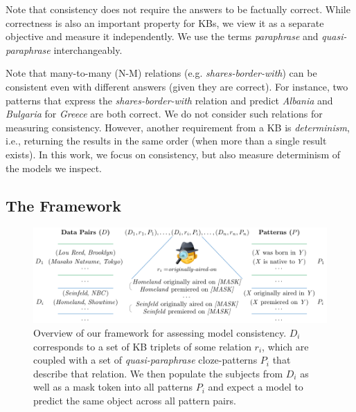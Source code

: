 Note that consistency does not require the answers to be factually correct. While correctness is also an important property for KBs, we view it as a separate objective and measure it independently.
We use the terms \textit{paraphrase} and \textit{quasi-paraphrase} interchangeably.
 


Note that many-to-many (N-M) relations (e.g. \textit{shares-border-with}) can be consistent 
even with different answers (given they are correct). For
instance, two patterns that express the
\textit{shares-border-with} relation and predict
\textit{Albania} and \textit{Bulgaria} for
\textit{Greece}
are both correct. We do not consider such relations for measuring consistency. However, another requirement from a KB is \textit{determinism}, i.e., returning the results in the same order (when more than a single result exists).
In this work, we focus on consistency, but also measure determinism of the models we inspect.

\subsection{The Framework}
\label{sec:framework}

\begin{figure}[t!]
\centering

\includegraphics[width=1.\columnwidth]{figures/framework}

\caption{Overview of our framework for assessing model consistency. $D_i$ corresponds to a set of KB triplets of some relation $r_i$, which are coupled with a set of \textit{quasi-paraphrase} cloze-patterns $P_i$ that describe that relation. We then populate the subjects from $D_i$ as well as a mask token into all patterns $P_i$ and expect a model to predict the same object across all pattern pairs.}
\label{fig:framework}
\end{figure}

